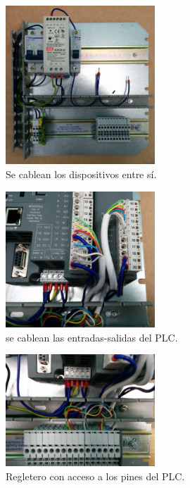     \begin{figure}[H]
            \centering
            \includegraphics[width=0.5\textwidth]{images/cuadro/IMG_20150313_182301.jpg}
            \caption{Se cablean los dispositivos entre sí.}
            \label{fig:cuad_montaje4}
    \end{figure}
       \begin{figure}[H]
            \centering
            \includegraphics[width=0.5\textwidth]{images/cuadro/IMG_20150331_113600.jpg}
            \caption{se cablean las entradas-salidas del PLC.}
            \label{fig:cuad_montaje5}
    \end{figure}
    \begin{figure}[H]
            \centering
            \includegraphics[width=0.5\textwidth]{images/cuadro/IMG_20150331_113607.jpg}
            \caption{Regletero con acceso a los pines del PLC.}
            \label{fig:cuad_montaje6}
    \end{figure}
